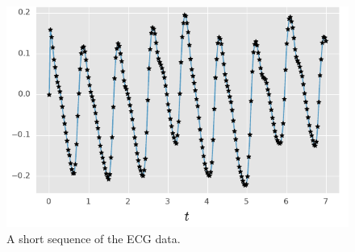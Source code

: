  
 \begin{figure}[htb]%
    \centering%
    \includegraphics{img/harmonic_trajectory}%
	\caption{%
	A short sequence of the ECG data. %
   	}
	\label{fig:ecg_data}
 \end{figure}
 
